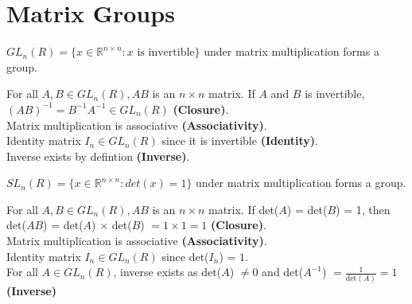 \section{Matrix Groups}
\begin{eg}
    $GL_n(R) = \{x \in \mathbb{R}^{n \times n}: x \text{ is invertible}\}$ under matrix multiplication forms a group.
\end{eg}
\begin{explanation}
    For all $A, B \in GL_n(R), AB$ is an $n\times n$ matrix. If $A$ and $B$ is invertible, $(AB)^{-1} = B^{-1} A^{-1} \in GL_n(R)$ \textbf{(Closure)}.\\
    Matrix multiplication is associative \textbf{(Associativity)}.\\
    Identity matrix $I_n \in GL_n(R)$ since it is invertible \textbf{(Identity)}.\\
    Inverse exists by defintion \textbf{(Inverse)}.\\
\end{explanation}
\begin{eg}
    $SL_n(R) = \{x \in \mathbb{R}^{n \times n}: det(x) = 1\}$ under matrix multiplication forms a group.
\end{eg}
\begin{explanation}
    For all $A, B \in GL_n(R), AB$ is an $n\times n$ matrix. If det($A$) = det($B$) = 1, then det($AB$) = det($A$) $\times$ det($B$) $= 1 \times 1 = 1$ \textbf{(Closure)}.\\
    Matrix multiplication is associative \textbf{(Associativity)}.\\
    Identity matrix $I_n \in GL_n(R)$ since det($I_n$) = $1$.\\
    For all $A \in GL_n(R)$, inverse exists as det($A$) $\neq 0$ and det($A^{-1}$) $= \frac{1}{\text{det}(A)} = 1$ \textbf{(Inverse)}\\
\end{explanation}
